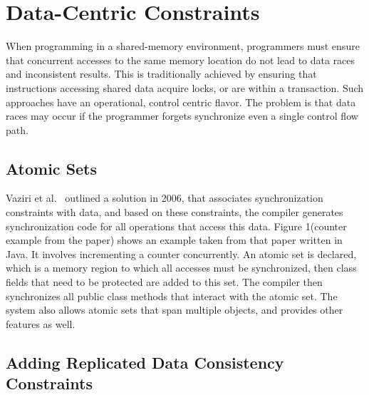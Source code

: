\documentclass[]{usiinfprospectus}
\begin{document}
\section{Data-Centric Constraints}

When programming in a shared-memory environment, programmers must ensure that concurrent accesses to the same memory location do not lead to data races and inconsistent results. This is traditionally achieved by ensuring that instructions accessing shared data acquire locks, or are within a transaction. Such approaches have an operational, control centric flavor. The problem is that data races may occur if the programmer forgets synchronize even a single control flow path.

\subsection{Atomic Sets}
Vaziri et al.~\cite{Vaziri:2006:ASC:1111320.1111067} outlined a solution in 2006, that associates synchronization constraints with data, and based on these constraints, the compiler generates synchronization code for all operations that access this data. Figure 1(counter example from the paper) shows an example taken from that paper written in Java. It involves incrementing a counter concurrently. An atomic set is declared, which is a memory region to which all accesses must be synchronized, then class fields that need to be protected are added to this set. The compiler then synchronizes all public class methods that interact with the atomic set. The system also allows atomic sets that span multiple objects, and provides other features as well.

\subsection{Adding Replicated Data Consistency Constraints}
\end{document}

